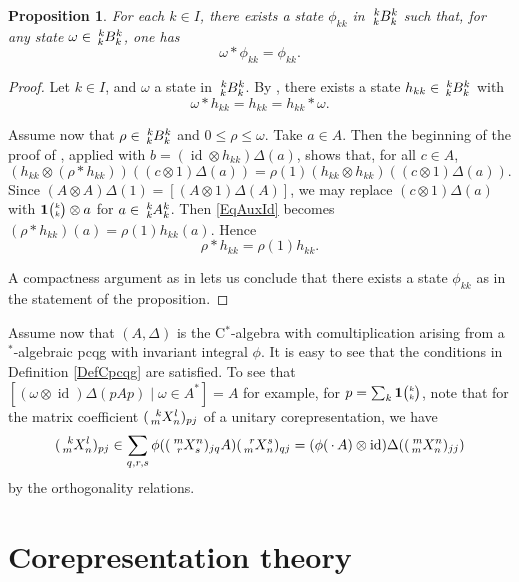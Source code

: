 \documentclass[11pt]{article}
\DeclareMathOperator{\id}{id}
\newcommand{\Grt}[3]{#1{\tiny {\begin{pmatrix} #2\\#3\end{pmatrix}}}}
\newcommand{\UnitC}[2]{\Grt{\mathbf{1}}{#1}{#2}}
\newcommand{\Gr}[5]{\,\tensor*[^{#2}_{#4}]{#1}{^{#3}_{#5}}}%
\newtheorem{Prop}[Theorem]{Proposition}
\theoremstyle{definition}
\numberwithin{equation}{section}
\begin{document}
\begin{Prop} For each $k\in I$, there exists a state $\phi_{kk}$ in $\Gr{B}{k}{k}{k}{k}$ such that, for any state $\omega \in \Gr{B}{k}{k}{k}{k}$, one has \[\omega*\phi_{kk} =\phi_{kk}.\]
\end{Prop} 
\begin{proof} Let $k\in I$, and $\omega$ a state in $\Gr{B}{k}{k}{k}{k}$. By \cite[Lemma 4.2]{MVD1},
  there exists a state $h_{kk} \in \Gr{B}{k}{k}{k}{k}$ with \[\omega *h_{kk}= h_{kk} =
  h_{kk}*\omega.\]

  Assume now that $\rho\in \Gr{B}{k}{k}{k}{k}$ and $0\leq \rho\leq \omega$. Take $a\in A$. Then the
  beginning of the proof of \cite[Lemma 4.3]{MVD1}, applied with $b= (\id\otimes h_{kk})\Delta(a)$,
  shows that, for all $c\in A$, 
  \begin{equation}\label{EqAuxId} (h_{kk}\otimes
    (\rho*h_{kk}))((c\otimes 1)\Delta(a)) = \rho(1) (h_{kk}\otimes h_{kk})((c\otimes
    1)\Delta(a)).\end{equation} 
Since $(A\otimes A)\Delta(1) = [(A\otimes 1)\Delta(A)]$, we may
  replace $(c\otimes 1)\Delta(a)$ with $\UnitC{k}{k}\otimes a$ for $a\in \Gr{A}{k}{k}{k}{k}$. Then
  \eqref{EqAuxId} becomes $(\rho*h_{kk})(a) = \rho(1)h_{kk}(a)$. Hence \[\rho*h_{kk} =
  \rho(1)h_{kk}.\]

A compactness argument as in \cite[Theorem 4.4]{MVD1} lets us conclude that there exists a state $\phi_{kk}$ as in the statement of the proposition.
\end{proof}


  Assume now that $(A,\Delta)$ is the C$^*$-algebra with comultiplication arising from a $^*$-algebraic pcqg with invariant integral $\phi$. It is easy to see that the conditions in Definition \ref{DefCpcqg} are satisfied. To see that $[(\omega\otimes \id)\Delta(pAp)\mid \omega \in A^*] = A$ for example, for $p = \sum_{k} \UnitC{k}{k}$, note that for the matrix coefficient $(\Gr{X}{k}{l}{m}{n})_{pj}$ of a unitary corepresentation, we have \[ (\Gr{X}{k}{l}{m}{n})_{pj} \in \sum_{q,r,s} \phi((\Gr{X}{m}{n}{r}{s})_{jq}A) (\Gr{X}{r}{s}{m}{n})_{qj} =(\phi(\,\cdot\, A)\otimes \id)\Delta((\Gr{X}{m}{n}{m}{n})_{jj})\] by the orthogonality relations. 




\section{Corepresentation theory}
\end{document}

